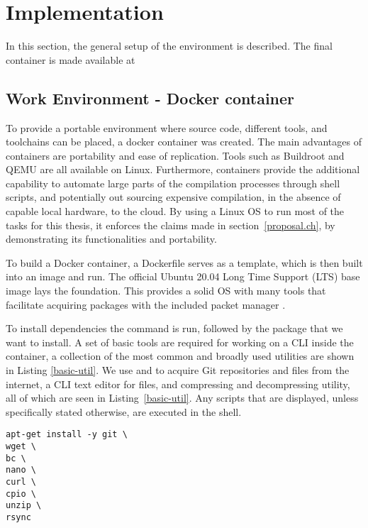 \chapter{Implementation}\label{imp.ch}

In this section, the general setup of the environment is described. The final container is made available at~\cite{myba}

\section{Work Environment - Docker container}\label{envsetup.ch}
To provide a portable environment where source code, different tools, and toolchains can be placed, a docker container was created. The main advantages of containers are portability and ease of replication. Tools such as Buildroot and QEMU are all available on Linux. Furthermore, containers provide the additional capability to automate large parts of the compilation processes through shell scripts, and potentially out sourcing expensive compilation, in the absence of capable local hardware, to the cloud. By using a Linux OS to run most of the tasks for this thesis, it enforces the claims made in section~\ref{proposal.ch}, by demonstrating its functionalities and portability.

To build a Docker container, a Dockerfile serves as a template, which is then built into an image and run. The official Ubuntu 20.04 Long Time Support (LTS) base image lays the foundation. This provides a solid OS with many tools that facilitate acquiring packages with the included packet manager . 

To install dependencies the  command is run, followed by the package that we want to install. A set of basic tools are required for working on a CLI inside the container, a collection of the most common and broadly used utilities are shown in Listing \ref{basic-util}. We use  and  to acquire Git repositories and files from the internet,  a CLI text editor for  files, and compressing and decompressing utility, all of which are seen in Listing~\ref{basic-util}. Any scripts that are displayed, unless specifically stated otherwise, are executed in the  shell.

\begin{lstlisting}[style=SH, caption=Installing basic utility, label=basic-util, float, floatplacement=H]
apt-get install -y git \
wget \
bc \
nano \
curl \
cpio \
unzip \
rsync
\end{lstlisting}

